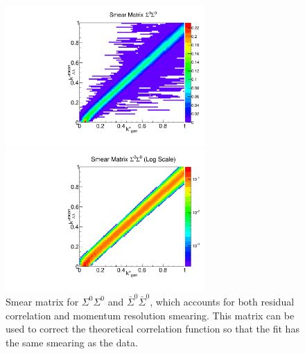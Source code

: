 \begin{figure}[h]
\begin{minipage}{18pc}
\includegraphics[width=18pc]{Figures/SmearMatrices/2016-7-19-SmearMatrixSigmaSigmaNormLLAA.pdf}
\end{minipage}\hspace{2pc}
\begin{minipage}{18pc}
\includegraphics[width=18pc]{Figures/SmearMatrices/2016-7-19-SmearMatrixSigmaSigmaNormLLAALog.pdf}
\end{minipage} 
\caption[Smear matrix -- $\Sigma^0\Sigma^0$ and $\bar{\Sigma}^0\bar{\Sigma}^0$]{
Smear matrix for $\Sigma^0\Sigma^0$ and $\bar{\Sigma}^0\bar{\Sigma}^0$, which accounts for both residual correlation and momentum resolution smearing. This matrix can be used to correct the theoretical correlation function so that the fit has the same smearing as the data.
}
\end{figure}


